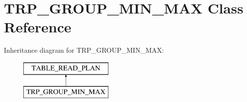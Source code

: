 \hypertarget{classTRP__GROUP__MIN__MAX}{}\section{T\+R\+P\+\_\+\+G\+R\+O\+U\+P\+\_\+\+M\+I\+N\+\_\+\+M\+AX Class Reference}
\label{classTRP__GROUP__MIN__MAX}
Inheritance diagram for T\+R\+P\+\_\+\+G\+R\+O\+U\+P\+\_\+\+M\+I\+N\+\_\+\+M\+AX\+:\begin{figure}[H]
\begin{center}
\leavevmode
\includegraphics[height=2.000000cm]{classTRP__GROUP__MIN__MAX}
\end{center}
\end{figure}
